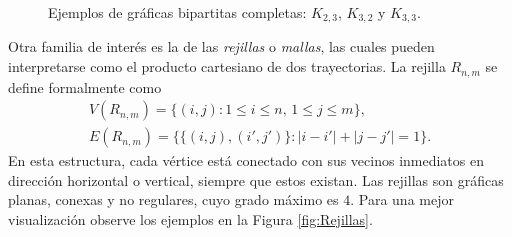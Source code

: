 \documentclass[12pt,titlepage,twoside,openright]{book}
\begin{document}
\begin{figure}[h]
    \centering
    \caption{Ejemplos de gr\'aficas bipartitas completas: $K_{2,3}$, $K_{3,2}$ y $K_{3,3}$.}
    \label{fig:Bipartitas}
\end{figure}
Otra familia de inter\'es es la de las \textit{rejillas} o \textit{mallas}, las cuales pueden interpretarse como el producto cartesiano de dos trayectorias. La rejilla $R_{n,m}$ se define formalmente como \begin{gather*} V(R_{n,m}) = \{(i,j) : 1 \leq i \leq n,\, 1 \leq j \leq m\}, \\ E(R_{n,m}) = \{\{(i,j),(i',j')\} : |i-i'| + |j-j'| = 1\}.\end{gather*} En esta estructura, cada v\'ertice est\'a conectado con sus vecinos inmediatos en direcci\'on horizontal o vertical, siempre que estos existan. Las rejillas son gr\'aficas planas, conexas y no regulares, cuyo grado m\'aximo es $4$. Para una mejor visualizaci\'on observe los ejemplos en la Figura \ref{fig:Rejillas}.  
\newpage
\end{document}

